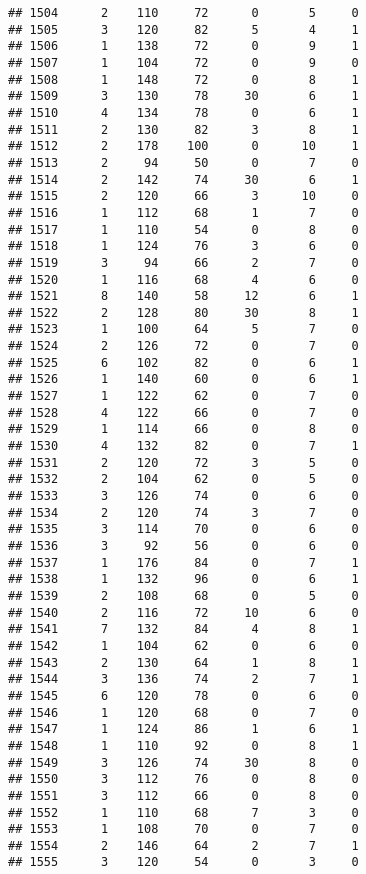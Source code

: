 \documentclass[
]{article}
\begin{document}
\begin{verbatim}
## 1504      2    110     72      0       5     0
## 1505      3    120     82      5       4     1
## 1506      1    138     72      0       9     1
## 1507      1    104     72      0       9     0
## 1508      1    148     72      0       8     1
## 1509      3    130     78     30       6     1
## 1510      4    134     78      0       6     1
## 1511      2    130     82      3       8     1
## 1512      2    178    100      0      10     1
## 1513      2     94     50      0       7     0
## 1514      2    142     74     30       6     1
## 1515      2    120     66      3      10     0
## 1516      1    112     68      1       7     0
## 1517      1    110     54      0       8     0
## 1518      1    124     76      3       6     0
## 1519      3     94     66      2       7     0
## 1520      1    116     68      4       6     0
## 1521      8    140     58     12       6     1
## 1522      2    128     80     30       8     1
## 1523      1    100     64      5       7     0
## 1524      2    126     72      0       7     0
## 1525      6    102     82      0       6     1
## 1526      1    140     60      0       6     1
## 1527      1    122     62      0       7     0
## 1528      4    122     66      0       7     0
## 1529      1    114     66      0       8     0
## 1530      4    132     82      0       7     1
## 1531      2    120     72      3       5     0
## 1532      2    104     62      0       5     0
## 1533      3    126     74      0       6     0
## 1534      2    120     74      3       7     0
## 1535      3    114     70      0       6     0
## 1536      3     92     56      0       6     0
## 1537      1    176     84      0       7     1
## 1538      1    132     96      0       6     1
## 1539      2    108     68      0       5     0
## 1540      2    116     72     10       6     0
## 1541      7    132     84      4       8     1
## 1542      1    104     62      0       6     0
## 1543      2    130     64      1       8     1
## 1544      3    136     74      2       7     1
## 1545      6    120     78      0       6     0
## 1546      1    120     68      0       7     0
## 1547      1    124     86      1       6     1
## 1548      1    110     92      0       8     1
## 1549      3    126     74     30       8     0
## 1550      3    112     76      0       8     0
## 1551      3    112     66      0       8     0
## 1552      1    110     68      7       3     0
## 1553      1    108     70      0       7     0
## 1554      2    146     64      2       7     1
## 1555      3    120     54      0       3     0

\end{verbatim}
\end{document}
